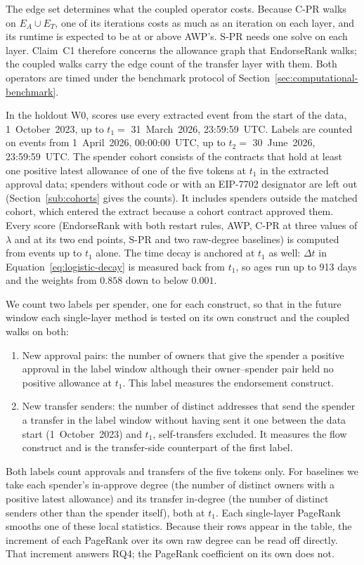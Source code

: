 The edge set determines what the coupled operator costs. Because C-PR walks on $E_A\cup E_T$, one of its iterations costs as much as an iteration on each layer, and its runtime is expected to be at or above AWP's. S-PR needs one solve on each layer. Claim~C1 therefore concerns the allowance graph that EndorseRank walks; the coupled walks carry the edge count of the transfer layer with them. Both operators are timed under the benchmark protocol of Section~\ref{sec:computational-benchmark}.


In the holdout W0, scores use every extracted event from the start of the data, 1~October~2023, up to $t_1=$ 31~March~2026, 23:59:59~UTC. Labels are counted on events from 1~April~2026, 00:00:00~UTC, up to $t_2=$ 30~June~2026, 23:59:59~UTC. The spender cohort consists of the contracts that hold at least one positive latest allowance of one of the five tokens at $t_1$ in the extracted approval data; spenders without code or with an EIP-7702 designator are left out (Section~\ref{sub:cohorts} gives the counts). It includes spenders outside the matched cohort, which entered the extract because a cohort contract approved them. Every score (EndorseRank with both restart rules, AWP, C-PR at three values of $\lambda$ and at its two end points, S-PR and two raw-degree baselines) is computed from events up to $t_1$ alone. The time decay is anchored at $t_1$ as well: $\Delta t$ in Equation~\eqref{eq:logistic-decay} is measured back from $t_1$, so ages run up to 913 days and the weights from $0.858$ down to below $0.001$.

We count two labels per spender, one for each construct, so that in the future window each single-layer method is tested on its own construct and the coupled walks on both:
\begin{enumerate}
\item New approval pairs: the number of owners that give the spender a positive approval in the label window although their owner--spender pair held no positive allowance at $t_1$. This label measures the endorsement construct.
\item New transfer senders: the number of distinct addresses that send the spender a transfer in the label window without having sent it one between the data start (1~October~2023) and $t_1$, self-transfers excluded. It measures the flow construct and is the transfer-side counterpart of the first label.
\end{enumerate}
Both labels count approvals and transfers of the five tokens only.
For baselines we take each spender's in-approve degree (the number of distinct owners with a positive latest allowance) and its transfer in-degree (the number of distinct senders other than the spender itself), both at $t_1$. Each single-layer PageRank smooths one of these local statistics. Because their rows appear in the table, the increment of each PageRank over its own raw degree can be read off directly. That increment answers RQ4; the PageRank coefficient on its own does not.

